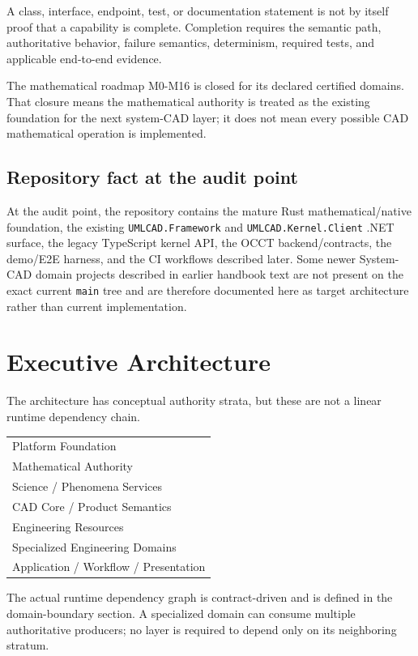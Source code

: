 \documentclass[11pt,a4paper]{report}
\begin{document}
A class, interface, endpoint, test, or documentation statement is not by itself proof that a capability is complete. Completion requires the semantic path, authoritative behavior, failure semantics, determinism, required tests, and applicable end-to-end evidence.

The mathematical roadmap M0-M16 is closed for its declared certified domains. That closure means the mathematical authority is treated as the existing foundation for the next system-CAD layer; it does not mean every possible CAD mathematical operation is implemented.

\section{Repository fact at the audit point}
At the audit point, the repository contains the mature Rust mathematical/native foundation, the existing \texttt{UMLCAD.Framework} and \texttt{UMLCAD.Kernel.Client} .NET surface, the legacy TypeScript kernel API, the OCCT backend/contracts, the demo/E2E harness, and the CI workflows described later. Some newer System-CAD domain projects described in earlier handbook text are not present on the exact current \texttt{main} tree and are therefore documented here as target architecture rather than current implementation.

\chapter{Executive Architecture}

The architecture has conceptual authority strata, but these are not a linear runtime dependency chain.

\begin{center}
\begin{tabularx}{0.78\textwidth}{@{}l@{}}
\toprule
Platform Foundation \\
Mathematical Authority \\
Science / Phenomena Services \\
CAD Core / Product Semantics \\
Engineering Resources \\
Specialized Engineering Domains \\
Application / Workflow / Presentation \\
\bottomrule
\end{tabularx}
\end{center}

The actual runtime dependency graph is contract-driven and is defined in the domain-boundary section. A specialized domain can consume multiple authoritative producers; no layer is required to depend only on its neighboring stratum.
\end{document}
